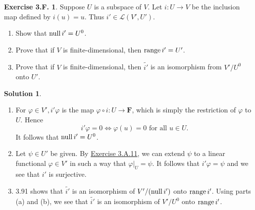 \documentclass[12pt]{article}
\theoremstyle{definition}
\theoremstyle{exercise}
\newtheorem{exercise}{Exercise 3.F.}
\theoremstyle{solution}
\newtheorem*{solution}{Solution}
\newcommand{\lmap}{\mathcal{L}}
\newcommand{\Null}{\text{null\,}}
\newcommand{\Range}{\text{range\,}}
\newcommand{\F}{\mathbf{F}}
\begin{document}
\begin{exercise}
\label{ex:36}
    Suppose \( U \) is a subspace of \( V \). Let \( i : U \to V \) be the inclusion map defined by \( i(u) = u \). Thus \( i' \in \lmap(V', U') \).
    \begin{enumerate}
        \item Show that \( \Null i' = U^0 \).

        \item Prove that if \( V \) is finite-dimensional, then \( \Range i' = U' \).

        \item Prove that if \( V \) is finite-dimensional, then \( \widetilde{i'} \) is an isomorphism from \( V'/U^0 \) onto \( U' \).
    \end{enumerate}

\end{exercise}

\begin{solution}
    \begin{enumerate}
        \item For \( \varphi \in V', i' \varphi \) is the map \( \varphi \circ i : U \to \F \), which is simply the restriction of \( \varphi \) to \( U \). Hence
        \[
            i' \varphi = 0 \iff \varphi(u) = 0 \text{ for all } u \in U.
        \]
        It follows that \( \Null i' = U^0 \).

        \item Let \( \psi \in U' \) be given. By \href{https://lew98.github.io/Mathematics/LADR_Section_3_A_Exercises.pdf}{Exercise 3.A.11}, we can extend \( \psi \) to a linear functional \( \varphi \in V' \) in such a way that \( \varphi|_U = \psi \). It follows that \( i' \varphi = \psi \) and we see that \( i' \) is surjective.

        \item 3.91 shows that \( \widetilde{i'} \) is an isomorphism of \( V'/(\Null i') \) onto \( \Range i' \). Using parts (a) and (b), we see that \( \widetilde{i'} \) is an isomorphism of \( V'/U^0 \) onto \( \Range i' \).
    \end{enumerate}
\end{solution}
\end{document}
